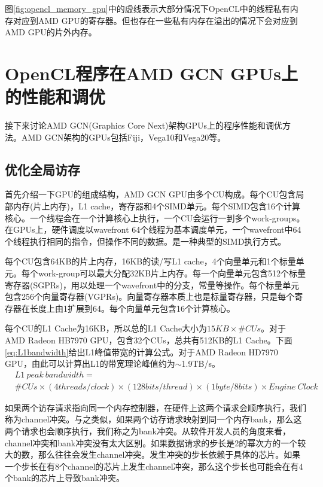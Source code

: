 图\ref{fig:opencl_memory_gpu}中的虚线表示大部分情况下OpenCL中的线程私有内存对应到AMD GPU的寄存器。但也存在一些私有内存在溢出的情况下会对应到AMD GPU的片外内存。


\section{OpenCL程序在AMD GCN GPUs上的性能和调优}
接下来讨论AMD GCN(Graphics Core Next)架构GPUs上的程序性能和调优方法。AMD GCN架构的GPUs包括Fiji，Vega10和Vega20等。

\subsection{优化全局访存}
首先介绍一下GPU的组成结构，AMD GCN GPU由多个CU构成。每个CU包含局部内存(片上内存)，L1 cache，寄存器和4个SIMD单元。每个SIMD包含16个计算核心。一个线程会在一个计算核心上执行，一个CU会运行一到多个work-groups。在GPUs上，硬件调度以wavefront 64个线程为基本调度单元，一个wavefront中64个线程执行相同的指令，但操作不同的数据。是一种典型的SIMD执行方式。

每个CU包含64KB的片上内存，16KB的读/写L1 cache，4个向量单元和1个标量单元。每个work-group可以最大分配32KB片上内存。每一个向量单元包含512个标量寄存器(SGPRs)，用以处理一个wavefront中的分支，常量等操作。每个标量单元包含256个向量寄存器(VGPRs)。向量寄存器本质上也是标量寄存器，只是每个寄存器在长度上由1扩展到64。每个向量单元包含16个计算核心。

每个CU的L1 Cache为16KB，所以总的L1 Cache大小为$15KB\times \#CUs$。对于AMD Radeon HB7970 GPU，包含32个CUs，总共有512KB的L1 Cache。下面\ref{eq:L1bandwidth}给出L1峰值带宽的计算公式。对于AMD Radeon HD7970 GPU，由此可以计算出L1的带宽理论峰值约为$\sim$1.9TB/s。
\begin{equation}
\label{eq:L1bandwidth}
\begin{aligned}
&L1\ peak\ bandwidth = \\
&\#CUs\times (4threads/clock) \times (128 bits/thread) \times (1byte/8bits) \times Engine\ Clock
\end{aligned}
\end{equation}
%



如果两个访存请求指向同一个内存控制器，在硬件上这两个请求会顺序执行，我们称为channel冲突。与之类似，如果两个访存请求映射到同一个内存bank，那么这两个请求也会顺序执行，我们称之为bank冲突。从软件开发人员的角度来看，channel冲突和bank冲突没有太大区别。如果数据请求的步长是2的幂次方的一个较大的数，那么往往会发生channel冲突。发生冲突的步长依赖于具体的芯片。如果一个步长在有8个channel的芯片上发生channel冲突，那么这个步长也可能会在有4个bank的芯片上导致bank冲突。

